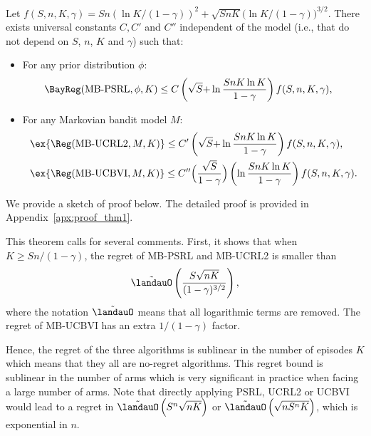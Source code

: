 \begin{thm}
    \label{thm:regret_upper_bound}
    Let $f(S,n,K,\gamma)=Sn\left(\ln K/(1{-}\gamma)\right)^{2}{+} \sqrt{SnK}\bigl(\ln K/(1{-}\gamma)\bigr)^{3/2}$. There exists universal constants $C, C'$ and $C''$ independent of the model (i.e., that do not depend on $S$, $n$, $K$ and $\gamma$) such that:
    \begin{itemize}
        \item For any prior distribution $\phi$:
        \begin{align*}
            \BayReg(\textnormal{MB-PSRL},\phi,K) &\le C\left(\sqrt{S} {+}\ln\frac{SnK\ln K}{1-\gamma}\right) f(S,n,K,\gamma),
        \end{align*}
        \item For any Markovian bandit model $M$:
    \begin{align*}
        &\ex{\Reg(\textnormal{MB-UCRL2},M,K)} \le C'\left(\sqrt{S} {+}\ln\frac{SnK\ln K}{1-\gamma}\right) f(S,n,K,\gamma),\\
        &\ex{\Reg(\textnormal{MB-UCBVI},M,K)} \le C''\Bigl(\frac{\sqrt{S}}{1-\gamma}\Bigr)\left(\ln\frac{SnK\ln K}{1-\gamma}\right) f(S,n,K,\gamma).
    \end{align*}
    \end{itemize}
\end{thm}

We provide a sketch of proof below. The detailed proof is provided in Appendix~\ref{apx:proof_thm1}.

This theorem calls for several comments. First, it shows that when $K\ge Sn/(1-\gamma)$, the regret of MB-PSRL and MB-UCRL2 is smaller than 
\begin{equation}
    \label{eq:regret_tilde}
    \tilde{\landauO}\left(\frac{S\sqrt{nK}}{(1-\gamma)^{3/2}}\right),
\end{equation}
where the notation $\tilde{\landauO}$ means that all logarithmic terms are removed. The regret of MB-UCBVI has an extra $1/(1-\gamma)$ factor. 

Hence, the regret of the three algorithms is sublinear in the number of episodes $K$ which means that they all are no-regret algorithms. This regret bound is sublinear in the number of arms which is very significant in practice when facing a large number of arms. Note that directly applying PSRL, UCRL2 or UCBVI would lead to a regret in  $\tilde{\landauO}\left(S^n\sqrt{nK}\right)$ or $\tilde{\landauO}\left(\sqrt{nS^nK}\right)$, which is exponential in $n$.


